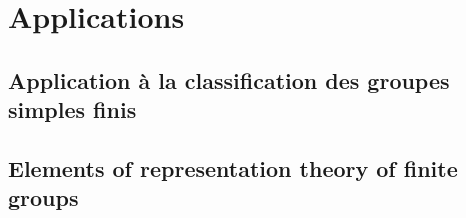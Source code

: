 \documentclass[french]{article}
\theoremstyle{definition}
\theoremstyle{plain}
\theoremstyle{plain}
\theoremstyle{plain}
\theoremstyle{plain}
\theoremstyle{plain}
\begin{document}
\clearpage
\section{Applications}
\subsection{Application à la classification des groupes simples finis}

\cite{dummit2003abstract}

\subsection{Elements of representation theory of finite groups}


\clearpage

\printbibliography
\end{document}
